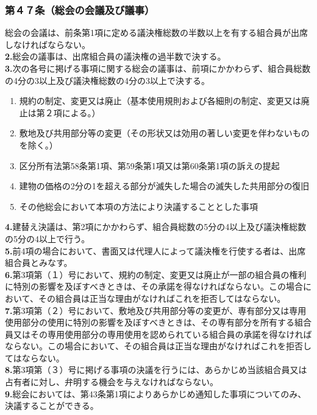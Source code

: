 \documentclass[12pt,uplatex]{jsarticle}
\begin{document}
\subsubsection*{第４７条（総会の会議及び議事）}
総会の会議は、前条第1項に定める議決権総数の半数以上を有する組合員が出席しなければならない。\\
\textbf{2.}総会の議事は、出席組合員の議決権の過半数で決する。\\
\textbf{3.}次の各号に掲げる事項に関する総会の議事は、前項にかかわらず、組合員総数の4分の3以上及び議決権総数の4分の3以上で決する。
\begin{enumerate}
\item 規約の制定、変更又は廃止（基本使用規則および各細則の制定、変更又は廃止は第２項による。）
\item 敷地及び共用部分等の変更（その形状又は効用の著しい変更を伴わないものを除く。）
\item 区分所有法第58条第1項、第59条第1項又は第60条第1項の訴えの提起
\item 建物の価格の2分の1を超える部分が滅失した場合の滅失した共用部分の復旧
\item その他総会において本項の方法により決議することとした事項
\end{enumerate}
\textbf{4.}建替え決議は、第2項にかかわらず、組合員総数の5分の4以上及び議決権総数の5分の4以上で行う。\\
\textbf{5.}前4項の場合において、書面又は代理人によって議決権を行使する者は、出席組合員とみなす。\\
\textbf{6.}第3項第（１）号において、規約の制定、変更又は廃止が一部の組合員の権利に特別の影響を及ぼすべきときは、その承諾を得なければならない。この場合において、その組合員は正当な理由がなければこれを拒否してはならない。\\
\textbf{7.}第3項第（２）号において、敷地及び共用部分等の変更が、専有部分又は専用使用部分の使用に特別の影響を及ぼすべきときは、その専有部分を所有する組合員又はその専用使用部分の専用使用を認められている組合員の承諾を得なければならない。この場合において、その組合員は正当な理由がなければこれを拒否してはならない。\\
\textbf{8.}第3項第（３）号に掲げる事項の決議を行うには、あらかじめ当該組合員又は占有者に対し、弁明する機会を与えなければならない。\\
\textbf{9.}総会においては、第43条第1項によりあらかじめ通知した事項についてのみ、決議することができる。
\end{document}
